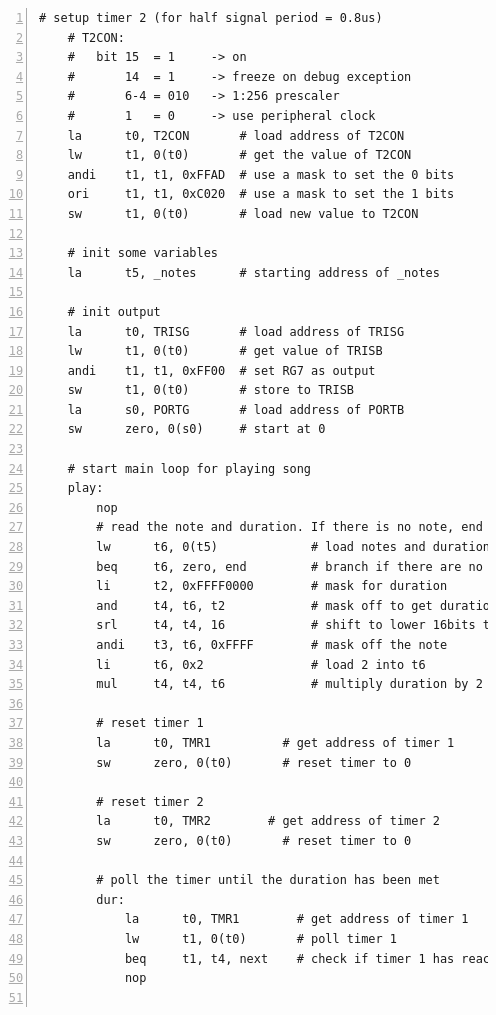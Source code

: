 \documentclass[11pt]{article}
\begin{document}
\begin{lstlisting}[numbers=left,basicstyle=\footnotesize]
    # setup timer 2 (for half signal period = 0.8us)
    # T2CON:
    #   bit 15  = 1     -> on
    #       14  = 1     -> freeze on debug exception
    #       6-4 = 010   -> 1:256 prescaler
    #       1   = 0     -> use peripheral clock
    la      t0, T2CON       # load address of T2CON
    lw      t1, 0(t0)       # get the value of T2CON
    andi    t1, t1, 0xFFAD  # use a mask to set the 0 bits
    ori     t1, t1, 0xC020  # use a mask to set the 1 bits
    sw      t1, 0(t0)       # load new value to T2CON

    # init some variables
    la      t5, _notes      # starting address of _notes

    # init output
    la      t0, TRISG       # load address of TRISG
    lw      t1, 0(t0)       # get value of TRISB
    andi    t1, t1, 0xFF00  # set RG7 as output
    sw      t1, 0(t0)       # store to TRISB
    la      s0, PORTG       # load address of PORTB
    sw      zero, 0(s0)     # start at 0

    # start main loop for playing song
    play:
        nop
        # read the note and duration. If there is no note, end
        lw      t6, 0(t5)             # load notes and duration into algebra register
        beq     t6, zero, end         # branch if there are no more notes
        li      t2, 0xFFFF0000        # mask for duration
        and     t4, t6, t2            # mask off to get duration
        srl     t4, t4, 16            # shift to lower 16bits to get duration
        andi    t3, t6, 0xFFFF        # mask off the note
        li      t6, 0x2               # load 2 into t6
        mul     t4, t4, t6            # multiply duration by 2

        # reset timer 1
        la      t0, TMR1          # get address of timer 1
        sw      zero, 0(t0)       # reset timer to 0

        # reset timer 2
        la      t0, TMR2        # get address of timer 2
        sw      zero, 0(t0)       # reset timer to 0

        # poll the timer until the duration has been met
        dur:
            la      t0, TMR1        # get address of timer 1
            lw      t1, 0(t0)       # poll timer 1
            beq     t1, t4, next    # check if timer 1 has reached duration
            nop


\end{lstlisting}
\end{document}
